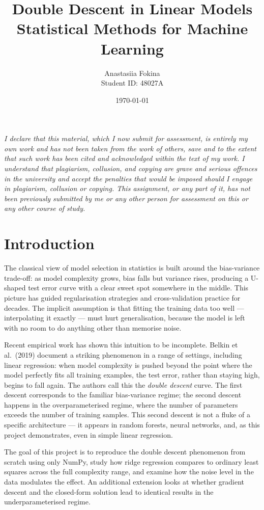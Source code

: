 \documentclass[11pt,a4paper]{article}
\title{\textbf{Double Descent in Linear Models}\\[0.4em]
\large Statistical Methods for Machine Learning}
\author{Anastasiia Fokina \\ Student ID: 48027A}
\date{\today}
\begin{document}
\maketitle

\noindent\textit{I declare that this material, which I now submit for assessment, is entirely my own work and has not been taken from the work of others, save and to the extent that such work has been cited and acknowledged within the text of my work. I understand that plagiarism, collusion, and copying are grave and serious offences in the university and accept the penalties that would be imposed should I engage in plagiarism, collusion or copying. This assignment, or any part of it, has not been previously submitted by me or any other person for assessment on this or any other course of study.}

\tableofcontents
\newpage

\section{Introduction}

The classical view of model selection in statistics is built around the bias-variance trade-off: as model complexity grows, bias falls but variance rises, producing a U-shaped test error curve with a clear sweet spot somewhere in the middle. This picture has guided regularisation strategies and cross-validation practice for decades. The implicit assumption is that fitting the training data too well --- interpolating it exactly --- must hurt generalisation, because the model is left with no room to do anything other than memorise noise.

Recent empirical work has shown this intuition to be incomplete. Belkin et al.\ (2019) document a striking phenomenon in a range of settings, including linear regression: when model complexity is pushed beyond the point where the model perfectly fits all training examples, the test error, rather than staying high, begins to fall again. The authors call this the \emph{double descent} curve. The first descent corresponds to the familiar bias-variance regime; the second descent happens in the overparameterised regime, where the number of parameters exceeds the number of training samples. This second descent is not a fluke of a specific architecture --- it appears in random forests, neural networks, and, as this project demonstrates, even in simple linear regression.

The goal of this project is to reproduce the double descent phenomenon from scratch using only NumPy, study how ridge regression compares to ordinary least squares across the full complexity range, and examine how the noise level in the data modulates the effect. An additional extension looks at whether gradient descent and the closed-form solution lead to identical results in the underparameterised regime.
\end{document}

